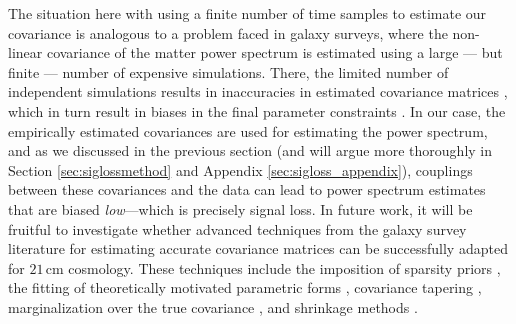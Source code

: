 \documentclass[preprint2,numberedappendix,tighten]{aastex6}  %
\begin{document}
The situation here with using a finite number of time samples to estimate our covariance is analogous to a problem faced in galaxy surveys, where the non-linear covariance 
of the matter power spectrum is estimated using a large --- but finite --- number of expensive simulations. There, the limited 
number of independent simulations results in inaccuracies in estimated covariance matrices 
\citep{dodelson_schneider2013,taylor_joachimi_etal2014}, which in turn result in biases in the final parameter constraints 
\citep{hartlap_et_al2007}. In our case, the empirically estimated covariances are used for estimating the power spectrum, and 
as we discussed in the previous section (and will argue more thoroughly in Section \ref{sec:siglossmethod} and Appendix \ref{sec:sigloss_appendix}), couplings between these covariances and the data can lead to power spectrum estimates that are biased 
\emph{low}---which is precisely signal loss. In future work, it will be fruitful to investigate whether advanced techniques from the 
galaxy survey literature for estimating accurate covariance matrices can be successfully adapted for $21\,\textrm{cm}$ 
cosmology. These techniques include the imposition of sparsity priors \citep{padmanabhan_et_al2016}, the fitting of 
theoretically motivated parametric forms \citep{pearson_samushia2016}, covariance tapering \citep{paz_sanchez2015}, 
marginalization over the true covariance \citep{sellentin_heavens2016}, and shrinkage methods 
\citep{pope_szapudi2008,joachimi_2017}.
\end{document}
